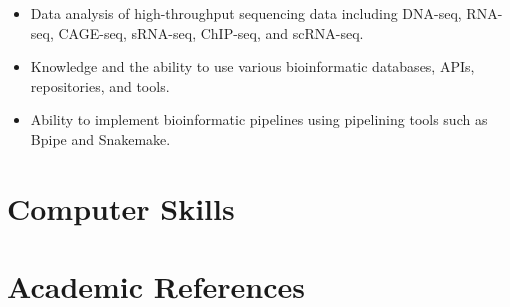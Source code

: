 \documentclass[letterpaper, 10pt]{article}
\begin{document}
\begin{itemize}
   \setlength\itemsep{0em}
   \item Data analysis of high-throughput sequencing data including DNA-seq, RNA-seq, CAGE-seq, sRNA-seq, ChIP-seq, and scRNA-seq.
   \item Knowledge and the ability to use various bioinformatic databases, APIs, repositories, and tools.
   \item Ability to implement bioinformatic pipelines using pipelining tools such as Bpipe and Snakemake.
\end{itemize}

\section*{Computer Skills}



\section*{Academic References}
\end{document}
